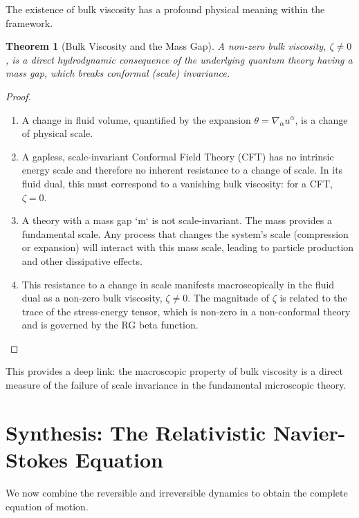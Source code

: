 \documentclass[11pt, letterpaper]{report}
\theoremstyle{plain} %
\newtheorem{theorem}{Theorem}[chapter]
\theoremstyle{definition} %
\theoremstyle{remark} %
\begin{document}
The existence of bulk viscosity has a profound physical meaning within the framework.
\begin{theorem}[Bulk Viscosity and the Mass Gap]
A non-zero bulk viscosity, $\zeta \neq 0$, is a direct hydrodynamic consequence of the underlying quantum theory having a mass gap, which breaks conformal (scale) invariance.
\end{theorem}
\begin{proof}
\begin{enumerate}
    \item A change in fluid volume, quantified by the expansion $\theta = \nabla_\alpha u^\alpha$, is a change of physical scale.
    \item A gapless, scale-invariant Conformal Field Theory (CFT) has no intrinsic energy scale and therefore no inherent resistance to a change of scale. In its fluid dual, this must correspond to a vanishing bulk viscosity: for a CFT, $\zeta=0$.
    \item A theory with a mass gap `m` is not scale-invariant. The mass provides a fundamental scale. Any process that changes the system's scale (compression or expansion) will interact with this mass scale, leading to particle production and other dissipative effects.
    \item This resistance to a change in scale manifests macroscopically in the fluid dual as a non-zero bulk viscosity, $\zeta \neq 0$. The magnitude of $\zeta$ is related to the trace of the stress-energy tensor, which is non-zero in a non-conformal theory and is governed by the RG beta function.
\end{enumerate}
\end{proof}
This provides a deep link: the macroscopic property of bulk viscosity is a direct measure of the failure of scale invariance in the fundamental microscopic theory.

\section{Synthesis: The Relativistic Navier-Stokes Equation}
\label{sec:hydro_navier_stokes}

We now combine the reversible and irreversible dynamics to obtain the complete equation of motion.
\end{document}
